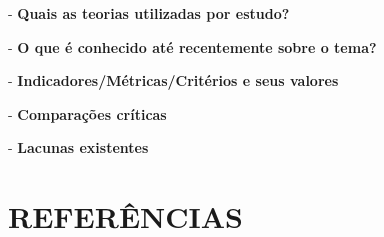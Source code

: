 \documentclass[12pt,a4paper]{article}
\begin{document}
\vspace{0.3cm}
\noindent \hspace{1cm} - \textbf{Quais as teorias utilizadas por estudo?} \hrulefill

\vspace{0.3cm}
\noindent \hspace{1cm} - \textbf{O que é conhecido até recentemente sobre o tema?} \hrulefill

\vspace{0.3cm}
\noindent - \textbf{Indicadores/Métricas/Critérios e seus valores} \hrulefill

\vspace{0.3cm}
\noindent - \textbf{Comparações críticas} \hrulefill

\vspace{0.3cm}
\noindent - \textbf{Lacunas existentes} \hrulefill

\newpage
\section*{REFERÊNCIAS}

\vspace{5cm}
\noindent \hrulefill
\end{document}
